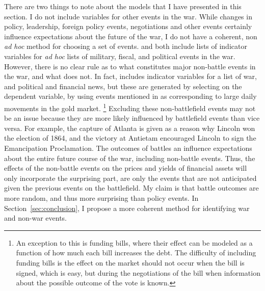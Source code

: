 There are two things to note about the models that I have presented in this section.
I do not include variables for other events in the war.
While changes in policy, leadership, foreign policy events, negotiations and other events certainly influence expectations about the future of the war, I do not have a coherent, non \textit{ad hoc} method for choosing a set of events.
\textcite{McCandless1996} and \textcite{SmithSmith1997} both include lists of indicator variables for \textit{ad hoc} lists of military, fiscal, and political events in the war.
However, there is no clear rule as to what constitutes major non-battle events in the war, and what does not.
In fact, \textcite{SmithSmith1997} includes indicator variables for a list of war, and political and financial news, but these are generated by selecting on the dependent variable, by using events mentioned in \textcite{Mitchell1903} as corresponding to large daily movements in the gold market.%
\footnote{
  An exception to this is funding bills, where their effect can be modeled as a function of how much each bill increases the debt.
  The difficulty of including funding bills is the effect on the market should not occur when the bill is signed, which is easy, but during the negotiations of the bill when information about the possible outcome of the vote is known.
}
Excluding these non-battlefield events may not be an issue because they are more likely influenced by battlefield events than vice versa.
For example, the capture of Atlanta is given as a reason why Lincoln won the election of 1864, and the victory at Antietam encouraged Lincoln to sign the Emancipation Proclamation.
The outcomes of battles an influence expectations about the entire future course of the war, including non-battle events.
Thus, the effects of the non-battle events on the prices and yields of financial assets will only incorporate the surprising part, are only the events that are not anticipated given the previous events on the battlefield.
My claim is that battle outcomes are more random, and thus more surprising than policy events.
In Section~\ref{sec:conclusion}, I propose a more coherent method for identifying war and non-war events.

